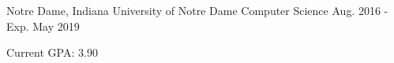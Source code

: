 \begin{cventries}
  \cventry
    {Notre Dame, Indiana}
    {University of Notre Dame}
    {Computer Science}
    {Aug. 2016 - Exp. May 2019}
    {
      \begin{cvitems}
        \item {Current GPA: 3.90}
      \end{cvitems}
    }
\end{cventries}
